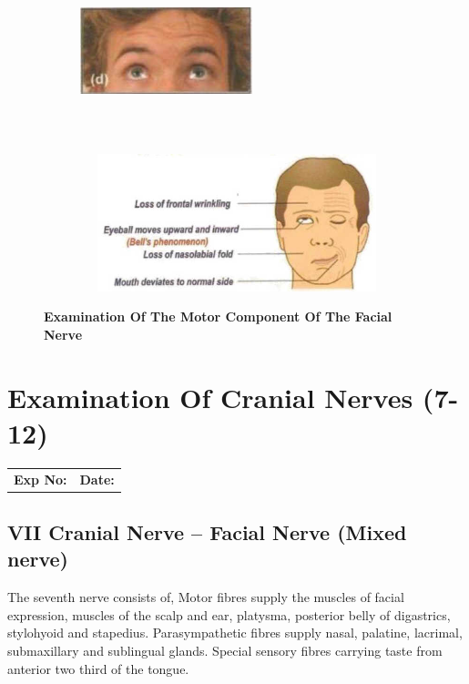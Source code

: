 \documentclass[a4paper,12pt,openany,twoside]{book}
\begin{document}
{\begin{figure}[h]
		\begin{subfigure}[t]{.48\textwidth}
			\centering
			\includegraphics[width=5cm,height=5cm]{./clinicalPhysioPic/cranialNerves7_12/7thNerve_4.jpg}
		\end{subfigure}
		\hspace{\fill}
		\begin{subfigure}[t]{\textwidth}
			\centering
			\includegraphics[width=10cm,height=4cm]{./clinicalPhysioPic/cranialNerves7_12/7thNerve_BellsPalsy.jpg}
		\end{subfigure}
		\hspace{\fill}
		\caption*{\textbf{Examination Of The Motor Component Of The Facial Nerve}}
	\end{figure}
}
														\chapter*{\centering Examination Of Cranial Nerves (7-12)}
															\begin{tabular}{p{5in} p{1in}}
																\textbf{Exp No:}  & \textbf{Date:}\\
															\end{tabular}
\section*{VII Cranial Nerve – Facial Nerve (Mixed nerve)}
The seventh nerve consists of,
Motor fibres supply the muscles of facial expression, muscles of the scalp and ear, platysma, posterior belly of digastrics, stylohyoid and stapedius.
Parasympathetic fibres supply nasal, palatine, lacrimal, submaxillary and sublingual glands.
Special sensory fibres carrying taste from anterior two third of the tongue.
\end{document}

